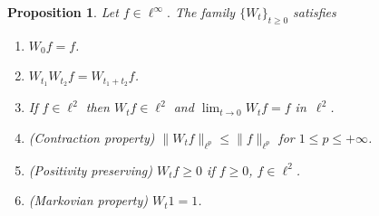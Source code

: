 \documentclass[11pt]{amsart}
\numberwithin{equation}{section}
\theoremstyle{plain}
\newtheorem{prop}{Proposition}
\theoremstyle{remark}
\begin{document}
\begin{prop}
\label{prop:heat-is-semigroup}
Let $f\in \ell^\infty.$
The family $\{W_t\}_{t \ge 0}$ satisfies
\begin{enumerate}
\item[(i)] $W_0f = f$.
\item[(ii)] $W_{t_1}W_{t_2}f = W_{t_1+t_2}f$.
\item[(iii)] If $f\in \ell^2$ then $W_tf \in \ell^2$ and $\lim_{t\to 0}W_tf= f$ in~$\ell^2$.
\item[(iv)] (Contraction property) $\|W_t f\|_{\ell^p} \le \|f\|_{\ell^p}$ for $1 \le p \le +\infty$.
\item[(v)] (Positivity preserving) $W_t f \ge 0$ if $f \ge 0$, $f\in \ell^2$.
\item[(vi)] (Markovian property) $W_t 1 = 1$.
\end{enumerate}
\end{prop}
\end{document}
